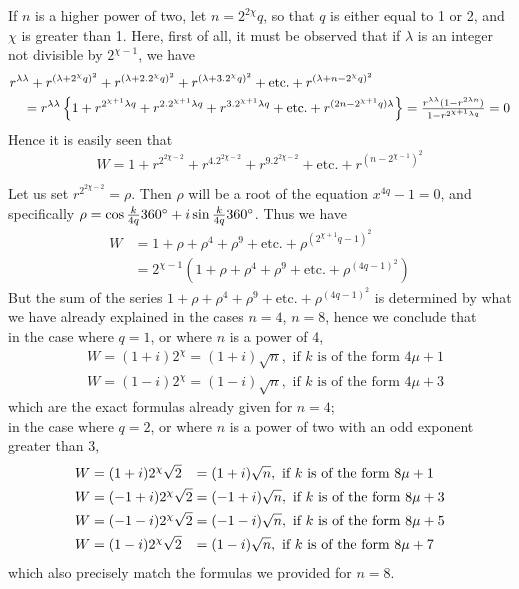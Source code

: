 \documentclass[twoside,12pt]{memoir}
\let\oldfrac\frac
\def\frac#1#2{\mathchoice{\tfrac{#1}{#2}}{\oldfrac{#1}{#2}}{\genfrac{}{}{}{2}{#1}{#2\mathstrut}}{\genfrac{}{}{}{3}{#1}{#2\mathstrut}}}
\begin{document}
If \(n\) is a higher power of two, let \(n=2^{2 \chi} q\), so that \(q\) is either equal to 1 or 2, and \(\chi\) is greater than 1. Here, first of all, it must be observed that if \(\lambda\) is an integer not divisible by \(2^{\chi-1}\), we have
\[\begin{aligned}
& r^{\lambda \lambda}+r^{(\lambda+2^{\chi} q)^{2}}+r^{(\lambda+2.2^{\chi} q)^{2}}+r^{(\lambda+3.2^{\chi} q)^{2}}+\text{etc{.}}+r^{(\lambda+n-2^{\chi} q)^{2}} \\
& \quad=r^{\lambda \lambda}\left\{1+r^{2^{\chi+1} \lambda q}+r^{2.2^{\chi+1} \lambda q}+r^{3.2^{\chi+1} \lambda q}+\text{etc{.}}+r^{(2 n-2^{\chi+1} q) \lambda}\right\}=\frac{r^{\lambda \lambda}(1-r^{2 \lambda n})}{1-r^{2^{\chi+1} \lambda q}}=0
\end{aligned}\]
Hence it is easily seen that
\[W=1+r^{2^{2 \chi-2}}+r^{4.2^{2 \chi-2}}+r^{9.2^{2 \chi-2}}+\text{etc{.}}+r^{(n-2^{\chi-1})^{2}}\]
%

Let us set \(r^{2^{2 \chi-2}}=\rho\). Then \(\rho\) will be a root of the equation \(x^{4 q}-1=0\), and specifically \(\rho=\cos \frac{k}{4 q} 360^{\circ}+i \sin \frac{k}{4 q} 360^{\circ}\). Thus we have
\[\begin{aligned}
W & =1+\rho+\rho^{4}+\rho^{9}+\text{etc{.}}+\rho^{(2^{\chi+1} q-1)^{2}} \\
& =2^{\chi-1}(1+\rho+\rho^{4}+\rho^{9}+\text{etc{.}}+\rho^{(4 q-1)^{2}})
\end{aligned}\]
But the sum of the series \(1+\rho+\rho^{4}+\rho^{9}+\text{etc{.}}+\rho^{(4 q-1)^{2}}\) is determined by what we have already explained in the cases \(n=4\), \(n=8\), hence we conclude that\\
in the case where \(q=1\), or where \(n\) is a power of 4,
\[\begin{aligned}
& W=(1+i) 2^{\chi}=(1+i) \sqrt n, \text{ if } k \text{ is of the form } 4 \mu+1 \\
& W=(1-i) 2^{\chi}=(1-i) \sqrt n, \text{ if } k \text{ is of the form } 4 \mu+3
\end{aligned}\]
which are the exact formulas already given for \(n=4\);\\
in the case where \(q=2\), or where \(n\) is a power of two with an odd exponent greater than 3,
\[\begin{alignedat}[t]{2}
W&=(1+i) 2^{\chi} \sqrt 2&&=(1+i) \sqrt n, \text{ if } k \text{ is of the form } 8 \mu+1 \\
W&=(-1+i) 2^{\chi} \sqrt 2&&=(-1+i) \sqrt n, \text{ if } k \text{ is of the form } 8 \mu+3 \\
W&=(-1-i) 2^{\chi} \sqrt 2&&=(-1-i) \sqrt n, \text{ if } k \text{ is of the form } 8 \mu+5 \\
W&=(1-i) 2^{\chi} \sqrt 2&&=(1-i) \sqrt n, \text{ if } k \text{ is of the form } 8 \mu+7
\end{alignedat}\]
which also precisely match the formulas we provided for \(n=8\).
%
\end{document}
